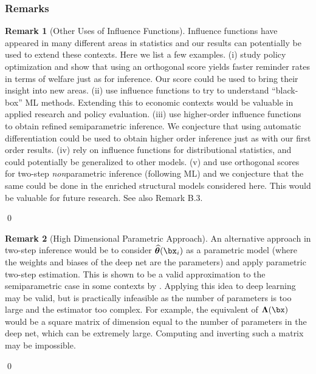 \documentclass[12pt]{article}
\numberwithin{equation}{section}
\theoremstyle{definition}
\newtheorem{remarkTmp}{Remark}
\newenvironment{remark}
	{\medskip  \begin{remarkTmp} 	}
	{ 
		\renewcommand{\qedsymbol}{$\clubsuit$}
		\qed 
		\end{remarkTmp} 
	}
\newcommand{\bL}{\boldsymbol{\Lambda}}
\newcommand{\bthat}{\bm{\widehat{\theta}}}
\begin{document}
\begin{appendices}
\subsubsection{Remarks}



\begin{remark}[Other Uses of Influence Functions]
    \label{rem:other uses}
    Influence functions have appeared in many different areas in statistics and our results can potentially be used to extend these contexts. Here we list a few examples. (i) \cite{Athey-Wager2021_Ecma} study policy optimization and show that using an orthogonal score yields faster reminder rates in terms of welfare just as for inference. Our score could be used to bring their insight into new areas. (ii) \cite{Koh-Liang2017_ICML} use influence functions to try to understand ``black-box'' ML methods. Extending this to economic contexts would be valuable in applied research and policy evaluation. (iii) \cite{Robins-etal2008_IMS} use higher-order influence functions to obtain refined semiparametric inference. We conjecture that using automatic differentiation could be used to obtain higher order inference just as with our first order results. (iv) \cite{Firpo-Fortin-Lemieux2009_Ecma} rely on influence functions for distributional statistics, and could potentially be generalized to other models. (v) \cite{Semenova-Chernozhukov2021_EJ} and \cite{Colangelo-Lee2023_WP} use orthogonal scores for two-step \emph{non}parametric inference (following ML) and we conjecture that the same could be done in the enriched structural models considered here. This would be valuable for future research. See also Remark B.3. 
\end{remark}


\begin{remark}[High Dimensional Parametric Approach]
    \label{rem:series approach}
    An alternative approach in two-step inference would be to consider $\bthat(\bx_i)$ as a parametric model (where the weights and biases of the deep net are the parameters) and apply parametric two-step estimation. This is shown to be a valid approximation to the semiparametric case in some contexts by \cite{Ackerberg-etal2012_REStat}. Applying this idea to deep learning may be valid, but is practically infeasible as the number of parameters is too large and the estimator too complex. For example, the equivalent of $\bL(\bx)$ would be a square matrix of dimension equal to the number of parameters in the deep net, which can be extremely large. Computing and inverting such a matrix may be impossible.
\end{remark}






\end{appendices}
\end{document}
